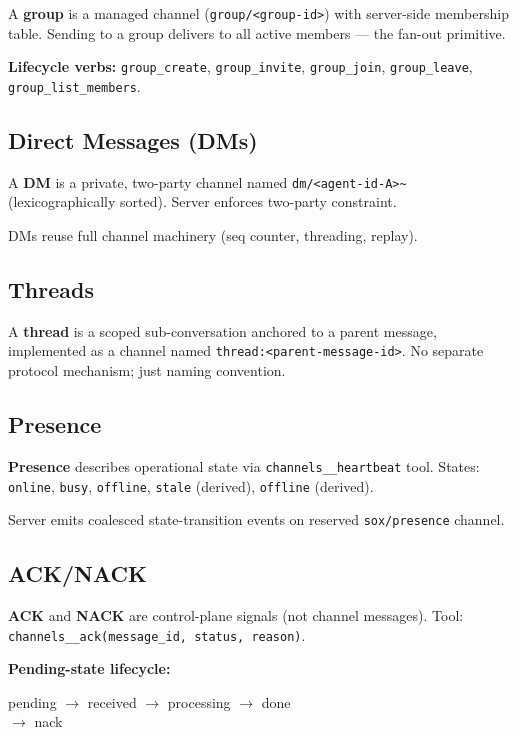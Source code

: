 \documentclass[11pt]{article}
\begin{document}
A \textbf{group} is a managed channel (\texttt{group/<group-id>}) with server-side membership table. Sending to a group delivers to all active members --- the fan-out primitive.

\textbf{Lifecycle verbs:} \texttt{group\_create}, \texttt{group\_invite}, \texttt{group\_join}, \texttt{group\_leave}, \texttt{group\_list\_members}.

\subsection{Direct Messages (DMs)}

A \textbf{DM} is a private, two-party channel named \texttt{dm/<agent-id-A>\textasciitilde<agent-id-B>} (lexicographically sorted). Server enforces two-party constraint.

DMs reuse full channel machinery (seq counter, threading, replay).

\subsection{Threads}

A \textbf{thread} is a scoped sub-conversation anchored to a parent message, implemented as a channel named \texttt{thread:<parent-message-id>}. No separate protocol mechanism; just naming convention.

\subsection{Presence}

\textbf{Presence} describes operational state via \texttt{channels\_\_heartbeat} tool. States: \texttt{online}, \texttt{busy}, \texttt{offline}, \texttt{stale} (derived), \texttt{offline} (derived).

Server emits coalesced state-transition events on reserved \texttt{sox/presence} channel.

\subsection{ACK/NACK}

\textbf{ACK} and \textbf{NACK} are control-plane signals (not channel messages). Tool: \texttt{channels\_\_ack(message\_id, status, reason)}.

\textbf{Pending-state lifecycle:}
\begin{center}
pending $\rightarrow$ received $\rightarrow$ processing $\rightarrow$ done \\
\hspace{2cm} $\rightarrow$ nack
\end{center}
\end{document}
